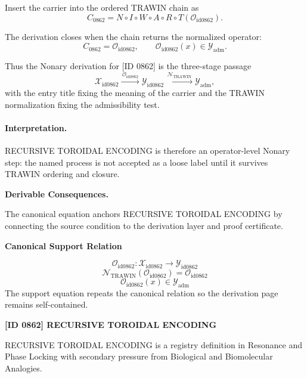Insert the carrier into the ordered TRAWIN chain as\[
C_{0862}=N\circ I\circ W\circ A\circ R\circ T(\mathcal{O}_{\mathrm{id0862}}).
\]

The derivation closes when the chain returns the normalized operator:\[
C_{0862}=\mathcal{O}_{\mathrm{id0862}},\qquad \mathcal{O}_{\mathrm{id0862}}(x)\in\mathcal{Y}_{\mathrm{adm}}.
\]

Thus the Nonary derivation for [ID 0862] is the three-stage passage
\[
\mathcal{X}_{\mathrm{id0862}}\xrightarrow{\,\mathcal{O}_{\mathrm{id0862}}\,} \mathcal{Y}_{\mathrm{id0862}}\xrightarrow{\,\mathcal{N}_{\mathrm{TRAWIN}}\,} \mathcal{Y}_{\mathrm{adm}},
\]
with the entry title fixing the meaning of the carrier and the TRAWIN normalization fixing the admissibility test.

\paragraph{Interpretation.} RECURSIVE TOROIDAL ENCODING is therefore an operator-level Nonary step: the named process is not accepted as a loose label until it survives TRAWIN ordering and closure.

\par\vspace{0.35em}
\noindent\textbf{Derivable Consequences.}\quad
\begingroup
\footnotesize
\raggedright
The canonical equation anchors RECURSIVE TOROIDAL ENCODING by connecting the source condition to the derivation layer and proof certificate.
\par\endgroup

\noindent\textbf{Canonical Support Relation}\par
\[
\mathcal{O}_{\mathrm{id0862}}:\mathcal{X}_{\mathrm{id0862}}\longrightarrow\mathcal{Y}_{\mathrm{id0862}}
\]
\[
\mathcal{N}_{\mathrm{TRAWIN}}(\mathcal{O}_{\mathrm{id0862}})=\mathcal{O}_{\mathrm{id0862}}
\]
\[
\mathcal{O}_{\mathrm{id0862}}(x)\in\mathcal{Y}_{\mathrm{adm}}
\]
\noindent The support equation repeats the canonical relation so the derivation page remains self-contained.\par

\clearpage
\noindent\textbf{[ID 0862] RECURSIVE TOROIDAL ENCODING}\par
\vspace{0.35em}
\begingroup\small
{}
RECURSIVE TOROIDAL ENCODING is a registry definition in Resonance and Phase Locking with secondary pressure from Biological and Biomolecular Analogies.

